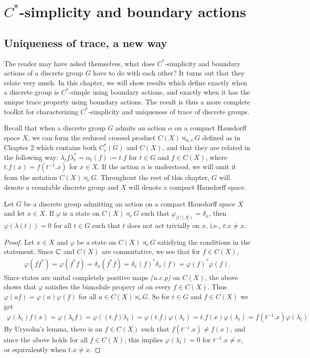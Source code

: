 \chapter{$C^*$-simplicity and boundary actions}
\section{Uniqueness of trace, a new way}
The reader may have asked themselves, what does $C^*$-simplicity and boundary actions of a discrete group $G$ have to do with each other? It turns out that they relate very much. In this chapter, we will show results which define exactly when a discrete group is $C^*$-simple using boundary actions, and exactly when it has the unique trace property using boundary actions. The result is thus a more complete toolkit for characterizing $C^*$-simplicity and uniqueness of trace of discrete groups.

Recall that when a discrete group $G$ admits an action $\alpha$ on a compact Hausdorff space $X$, we can form the reduced crossed product $C(X) \rtimes_{\alpha,r} G$ defined as in Chapter 2 which contains both $C_r^*(G)$ and $C(X)$, and that they are related in the following way:  $\lambda_t f \lambda_t^*=\alpha_t(f):=t.f$ for $t \in G$ and $f \in C(X)$, where $t.f(x)=f(t^{-1}.x)$ for $x \in X$. If the action $\alpha$ is understood, we will omit it from the notation $C(X) \rtimes_r G$. Throughout the rest of this chapter, $G$ will denote a countable discrete group and $X$ will denote a compact Hausdorff space.


\begin{lemma}\label{state restrict point eval 0}
Let $G$ be a discrete group admitting an action on a compact Hausdorff space $X$ and let $x \in X$. If $\varphi$ is a state on $C(X) \rtimes_r G$ such that $\varphi_{|C(X)}= \delta_x$, then $\varphi(\lambda(t))=0$ for all $t \in G$ such that $t$ does not act trivially on $x$, i.e., $t.x \neq x$.
\begin{proof}
Let $x \in X$ and $\varphi$ be a state on $C(X) \rtimes_r G$ satisfying the conditions in the statement. Since $\mathbb{C}$ and $C(X)$ are commutative, we see that for $f \in C(X)$,
\begin{align*}
\varphi(ff^*)=\varphi(f^*f)=\delta_x(f^*f)=\delta_x(f)^* \delta_x(f) =\varphi(f)^* \varphi(f).
\end{align*}
Since states are unital completely positive maps \textit{(u.c.p)} on $C(X)$, the above shows that $\varphi$ satisfies the bimodule propery of \cite[Proposition 1.5.7][12]{brown2008c} on every $f \in C(X)$. Thus $\varphi(af)=\varphi(a)\varphi(f)$ for all $a \in C(X) \rtimes_r G$. So for $t \in G$ and $f \in C(X)$ we get
\begin{align*}
\varphi(\lambda_t)f(x)=\varphi(\lambda_t f)=\varphi((t.f) \lambda_t) =\varphi(t.f) \varphi(\lambda_t)= t.f(x) \varphi(\lambda_t)=f(t^{-1}.x) \varphi(\lambda_t)
\end{align*}
By Urysohn's lemma, there is an $f \in C(X)$ such that $f(t^{-1}. x) \neq f(x)$, and since the above holds for all $f \in C(X)$, this implies $\varphi(\lambda_t)=0$ for $t^{-1} .x \neq x$, or equivalently when $t.x \neq x$.
\end{proof}
\end{lemma}

